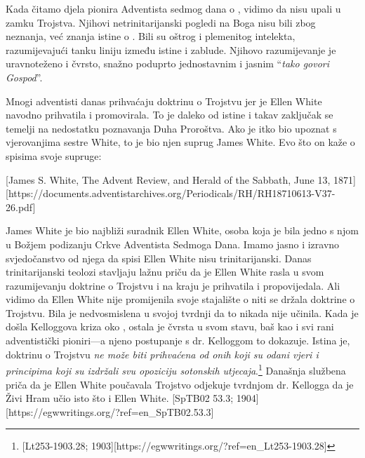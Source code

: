 Kada čitamo djela pionira Adventista sedmog dana o , vidimo da nisu upali u zamku Trojstva. Njihovi netrinitarijanski pogledi na Boga nisu bili zbog neznanja, već znanja istine o . Bili su oštrog i plemenitog intelekta, razumijevajući tanku liniju između istine i zablude. Njihovo razumijevanje  je uravnoteženo i čvrsto, snažno poduprto jednostavnim i jasnim “\textit{tako govori Gospod}”.

Mnogi adventisti danas prihvaćaju doktrinu o Trojstvu jer je Ellen White navodno prihvatila i promovirala. To je daleko od istine i takav zaključak se temelji na nedostatku poznavanja Duha Proroštva. Ako je itko bio upoznat s vjerovanjima sestre White, to je bio njen suprug James White. Evo što on kaže o spisima svoje supruge:

[James S. White, The Advent Review, and Herald of the Sabbath, June 13, 1871][https://documents.adventistarchives.org/Periodicals/RH/RH18710613-V37-26.pdf]

James White je bio najbliži suradnik Ellen White, osoba koja je bila jedno s njom u Božjem podizanju Crkve Adventista Sedmoga Dana. Imamo jasno i izravno svjedočanstvo od njega da spisi Ellen White nisu trinitarijanski. Danas trinitarijanski teolozi stavljaju lažnu priču da je Ellen White rasla u svom razumijevanju doktrine o Trojstvu i na kraju je prihvatila i propovijedala. Ali vidimo da Ellen White nije promijenila svoje stajalište o  niti se držala doktrine o Trojstvu. Bila je nedvosmislena u svojoj tvrdnji da to nikada nije učinila. Kada je došla Kelloggova kriza oko , ostala je čvrsta u svom stavu, baš kao i svi rani adventistički pioniri—a njeno postupanje s dr. Kelloggom to dokazuje. Istina je, doktrinu o Trojstvu \textit{ne može biti prihvaćena od onih koji su odani vjeri i principima koji su izdržali svu opoziciju sotonskih utjecaja}.\footnote{[Lt253-1903.28; 1903][https://egwwritings.org/?ref=en\_Lt253-1903.28]} Današnja službena priča da je Ellen White poučavala Trojstvo odjekuje tvrdnjom dr. Kellogga da je Živi Hram učio isto što i Ellen White. [SpTB02 53.3; 1904][https://egwwritings.org/?ref=en\_SpTB02.53.3]

